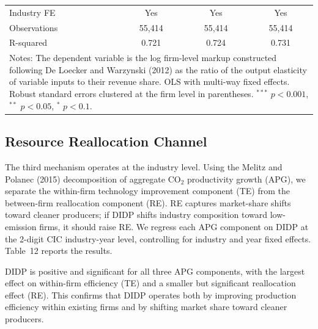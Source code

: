 \documentclass[11pt,a4paper]{article}
\begin{document}
\begin{table}[htbp]
\begin{tabular}{lccc}
Industry FE     & Yes & Yes & Yes \\
Observations    & 55{,}414 & 55{,}414 & 55{,}414 \\
R-squared       & 0.721 & 0.724 & 0.731 \\
\bottomrule
\multicolumn{4}{p{0.85\textwidth}}{\footnotesize Notes: The dependent variable is the log firm-level markup constructed following De Loecker and Warzynski (2012) as the ratio of the output elasticity of variable inputs to their revenue share. OLS with multi-way fixed effects. Robust standard errors clustered at the firm level in parentheses. $^{***}$ $p<0.001$, $^{**}$ $p<0.05$, $^{*}$ $p<0.1$.}
\end{tabular}
\end{table}

\subsection{Resource Reallocation Channel}

The third mechanism operates at the industry level. Using the Melitz and Polanec (2015) decomposition of aggregate CO$_2$ productivity growth (APG), we separate the within-firm technology improvement component (TE) from the between-firm reallocation component (RE). RE captures market-share shifts toward cleaner producers; if DIDP shifts industry composition toward low-emission firms, it should raise RE. We regress each APG component on DIDP at the 2-digit CIC industry-year level, controlling for industry and year fixed effects. Table~12 reports the results.


DIDP is positive and significant for all three APG components, with the largest effect on within-firm efficiency (TE) and a smaller but significant reallocation effect (RE). This confirms that DIDP operates both by improving production efficiency within existing firms and by shifting market share toward cleaner producers.
\end{document}
